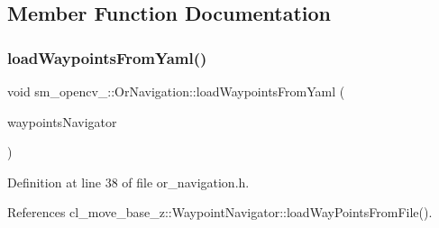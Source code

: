 \subsection{Member Function Documentation}
\mbox{\label{classsm__opencv__2_1_1OrNavigation_a7d151913cbad3b640163c4b2e84bfb35}} 
\subsubsection{\texorpdfstring{load\+Waypoints\+From\+Yaml()}{loadWaypointsFromYaml()}}
{\footnotesize\ttfamily void sm\+\_\+opencv\+\_\+::\+Or\+Navigation\+::load\+Waypoints\+From\+Yaml (\begin{DoxyParamCaption}\item[{\hyperlink{classcl__move__base__z_1_1WaypointNavigator}{Waypoint\+Navigator} $\ast$}]{waypoints\+Navigator }\end{DoxyParamCaption})\hspace{0.3cm}{\ttfamily [inline]}}



Definition at line 38 of file or\+\_\+navigation.\+h.



References cl\+\_\+move\+\_\+base\+\_\+z\+::\+Waypoint\+Navigator\+::load\+Way\+Points\+From\+File().


